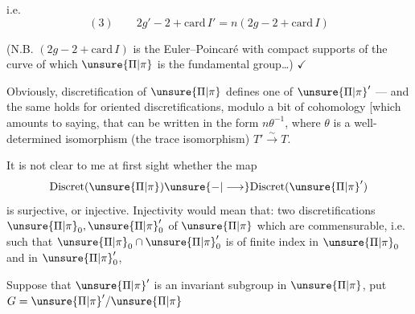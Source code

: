 i.e.
\[
(3)\qquad 2g'-2+\mathrm{card}\,I'=n(2g-2+\mathrm{card}\,I)
\]

(N.B.  \((2g-2+\mathrm{card}\,I)\) is
 the Euler--Poincaré  with compact
supports of the curve of which \(\unsure{\Pi|\pi}\) is the fundamental
group\ldots) \(\checkmark\)


Obviously,  discretification of \(\unsure{\Pi|\pi}\)
defines one of \(\unsure{\Pi|\pi}'\) --- and the same holds
for oriented discretifications, modulo
a bit of cohomology [which amounts to saying,
that
can be written in the form \(n\theta^{-1}\), where \(\theta\) is a well-determined isomorphism
(the trace isomorphism)  \(T'\xrightarrow{\sim}T\).

It is not clear to me at first
sight whether the map
\[
\mathrm{Discret}(\unsure{\Pi|\pi})\unsure{-|\longrightarrow}\mathrm{Discret}(\unsure{\Pi|\pi}')
\]
is surjective, or injective. Injectivity
would mean that: two discretifications \(\unsure{\Pi|\pi}_0,\unsure{\Pi|\pi}'_0\) of
\(\unsure{\Pi|\pi}\) which are commensurable, i.e. such that
\(\unsure{\Pi|\pi}_0\cap\unsure{\Pi|\pi}'_0\) is of finite index in \(\unsure{\Pi|\pi}_0\) and in \(\unsure{\Pi|\pi}'_0\),

Suppose that \(\unsure{\Pi|\pi}'\) is an invariant subgroup
in \(\unsure{\Pi|\pi}\), put \(G=\unsure{\Pi|\pi}'/\unsure{\Pi|\pi}\)

